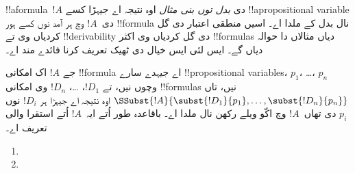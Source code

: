 \documentclass[../../../include/open-logic-section]{subfiles}
\begin{document}


!!a{formula}~$!A$ دی \emph{بدل توں بنی مثال} اوہ نتیجہ اے جیہڑا
کسے !!a{propositional variable} دی~$!A$ وچ ہر آمد نوں
کسے ہور !!{formula} نال بدل کے ملدا اے۔ اسیں منطقی اعتبار دی گل
کردیاں وی تے !!{derivability} دی گل کردیاں وی اکثر
!!{formula}s دیاں مثالاں دا حوالہ دیاں گے۔ ایس لئی ایس خیال
دی ٹھیک تعریف کرنا فائدے مند اے۔

\begin{defn}
  جے $!A$ اک امکانی !!{formula} اے جیہدے سارے !!{propositional
    variable}s، $p_1$، \dots، $p_n$ وچوں نیں، تے $!D_1$، \dots،
  $!D_n$ وی امکانی !!{formula}s نیں، تاں
  $\SSubst{!A}{\subst{!D_1}{p_1}, \dots, \subst{!D_n}{p_n}}$
  اوہ نتیجہ اے جیہڑا ہر $!D_i$ نوں $p_i$ دی تھاں~$!A$ وچ
  اکّو ویلے رکھن نال ملدا اے۔ باقاعدہ طور اُتے ایہ~$!A$ اُتے
  استقرا والی تعریف اے۔
  \begin{enumerate}
    \item {}
    \item {}
\end{enumerate}
\end{defn}
\end{document}
